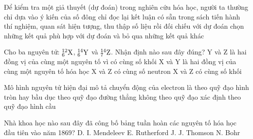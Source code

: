 \documentclass[11pt,a4paper]{article}
\begin{document}
\begin{ex}
Để kiểm tra một giả thuyết (dự đoán) trong nghiên cứu hóa học, người ta thường
\choice
{chỉ dựa vào ý kiến của số đông}
{chỉ đọc lại kết luận có sẵn trong sách}
{\True tiến hành thí nghiệm, quan sát hiện tượng, thu thập số liệu rồi đối chiếu với dự đoán}
{chọn những kết quả phù hợp với dự đoán và bỏ qua những kết quả khác}

\end{ex}
\begin{ex}
Cho ba nguyên tử: $^{12}_6\ce{X}$, $^{14}_6\ce{Y}$ và $^{14}_7\ce{Z}$. Nhận định nào sau đây đúng?
\choice
{Y và Z là hai đồng vị của cùng một nguyên tố vì có cùng số khối}
{\True X và Y là hai đồng vị của cùng một nguyên tố hóa học}
{X và Z có cùng số neutron}
{X và Z có cùng số khối}

\end{ex}
\begin{ex}
Mô hình nguyên tử hiện đại mô tả chuyển động của electron là
\choice
{theo quỹ đạo hình tròn hay bầu dục}
{theo quỹ đạo đường thẳng}
{\True không theo quỹ đạo xác định}
{theo quỹ đạo hình cầu}

\end{ex}
\begin{ex}
Nhà khoa học nào sau đây đã công bố bảng tuần hoàn các nguyên tố hóa học đầu tiên vào năm 1869?
\choice
{\True D. I. Mendeleev}
{E. Rutherford}
{J. J. Thomson}
{N. Bohr}

\end{ex}
\end{document}
